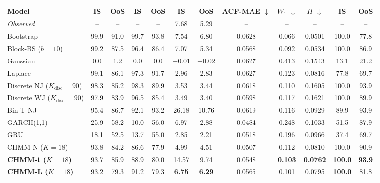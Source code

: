 \begin{table}[t]
{\begin{tabular}{l cc cc cc c c c cc}
Model & IS & OoS & IS & OoS & IS & OoS & ACF-MAE $\downarrow$ & $W_1$ $\downarrow$ & $H$ $\downarrow$ & IS & OoS \\
\midrule
\textit{Observed}   & --    & --    & --    & --    & 7.68    & 5.29    & --     & --    & --     & --    & --    \\
Bootstrap           & 99.9  & 91.0  & 99.7  & 93.8  & 7.54    & 6.80    & 0.0628 & 0.066 & 0.0501 & 100.0 & 77.8  \\
Block-BS ($b=10$)   & 99.2  & 87.5  & 96.4  & 86.4  & 7.07    & 5.34    & 0.0568 & 0.092 & 0.0534 & 100.0 & 86.9  \\
Gaussian            & 0.0   & 1.2   & 0.0   & 0.0   & $-0.01$ & $-0.02$ & 0.0627 & 0.413 & 0.1543 & 13.1  & 21.2  \\
Laplace             & 99.1  & 86.1  & 97.3  & 91.7  & 2.96    & 2.83    & 0.0627 & 0.123 & 0.0816 & 77.8  & 69.7  \\
Discrete NJ ($K_{\text{disc}} = 90$) & 98.3  & 85.2  & 98.3  & 89.9  & 3.53    & 3.44    & 0.0618 & 0.110 & 0.1605 & 100.0 & 93.9  \\
Discrete WJ ($K_{\text{disc}} = 90$) & 97.9  & 83.9  & 96.5  & 85.4  & 3.49    & 3.40    & 0.0598 & 0.117 & 0.1621 & 100.0 & 89.9  \\
Bin-T NJ            & 95.4  & 86.7  & 92.1  & 93.2  & 26.18   & 10.76   & 0.0619 & 0.116 & 0.0929 & 89.9  & 93.9  \\
GARCH(1,1)          & 25.9  & 58.2  & 10.0  & 56.0  & 6.97    & 2.88    & 0.0484 & 0.248 & 0.1033 & 51.5  & 87.9  \\
GRU                 & 18.1  & 52.5  & 13.7  & 55.0  & 2.85    & 2.21    & 0.0518 & 0.196 & 0.0966 & 37.4  & 69.7  \\
CHMM-N ($K=18$)     & 93.8  & 84.2  & 86.6  & 77.9  & 4.99    & 4.51    & 0.0507 & 0.112 & 0.0810 & 100.0 & 90.9  \\
\textbf{CHMM-t ($K=18$)} & 93.7  & 85.9  & 88.9  & 80.0  & 14.57   & 9.74    & 0.0548 & \textbf{0.103} & \textbf{0.0762} & \textbf{100.0} & \textbf{93.9} \\
\textbf{CHMM-L ($K=18$)} & 93.2  & 79.3 & 91.2  & 79.3  & \textbf{6.75} & \textbf{6.29} & 0.0565 & 0.101 & 0.0795 & \textbf{100.0} & 81.8  \\
\bottomrule
\end{tabular}%
}
\end{table}

